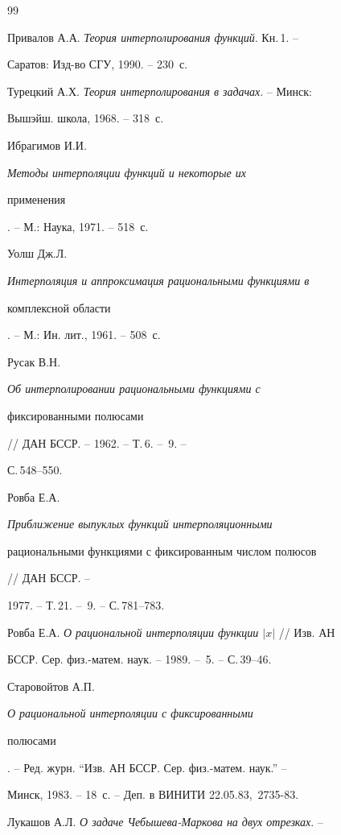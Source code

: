\begin{thebibliography}{99}







Привалов А.А. {\em Теория интерполирования функций}. Кн.\,1. --


Саратов: Изд-во СГУ, 1990. -- 230~с.




Турецкий А.Х. {\em Теория интерполирования в задачах}. -- Минск:


Вышэйш. школа, 1968. -- 318~с.




Ибрагимов И.И. {\em Методы интерполяции функций и некоторые их


применения}. -- М.: Наука, 1971. -- 518~с.




Уолш Дж.Л.{\em Интерполяция и аппроксимация рациональными функциями в


комплексной области}. -- М.: Ин. лит., 1961. -- 508~с.




Русак В.Н. {\em Об интерполировании рациональными функциями с


фиксированными полюсами} // ДАН БССР. -- 1962. -- Т.\,6. -- \No\,9. --


С.\,548--550.




Ровба Е.А. {\em Приближение выпуклых функций интерполяционными


рациональными функциями с фиксированным числом полюсов} // ДАН БССР. --


1977. -- Т.\,21. -- \No\,9. -- С.\,781--783.




Ровба Е.А. {\em О рациональной интерполяции функции $|x|$} // Изв. АН


БССР. Сер. физ.-матем. наук. -- 1989. -- \No\,5. -- С.\,39--46.




Старовойтов А.П. {\em О рациональной интерполяции с фиксированными


полюсами}. -- Ред. журн. ``Изв. АН БССР. Сер. физ.-матем. наук.'' --


Минск, 1983. -- 18~с. -- Деп. в ВИНИТИ 22.05.83, \No\,2735-83.




Лукашов А.Л. {\em О задаче Чебышева-Маркова на двух отрезках}. --



\end{thebibliography}
